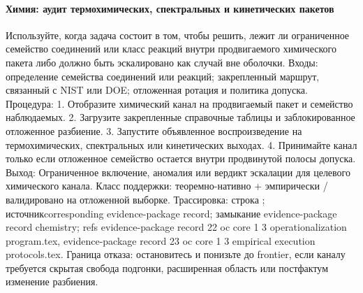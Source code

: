 \paragraph{Химия: аудит термохимических, спектральных и кинетических пакетов}
Используйте, когда задача состоит в том, чтобы решить, лежит ли ограниченное семейство соединений или класс реакций внутри продвигаемого химического пакета либо должно быть эскалировано как случай вне оболочки.
Входы: определение семейства соединений или реакций; \allowbreak закрепленный маршрут, связанный с NIST или DOE; \allowbreak отложенная ротация и политика допуска.
Процедура: 1. Отобразите химический канал на продвигаемый пакет и семейство наблюдаемых. 2. Загрузите закрепленные справочные таблицы и заблокированное отложенное разбиение. 3. Запустите объявленное воспроизведение на термохимических, спектральных или кинетических выходах. 4. Принимайте канал только если отложенное семейство остается внутри продвинутой полосы допуска.
Выход: Ограниченное включение, аномалия или вердикт эскалации для целевого химического канала.
Класс поддержки: теоремно-нативно + эмпирически / валидировано на отложенной выборке.
Трассировка: строка ; \allowbreak источникcorresponding evidence-package record; \allowbreak замыкание evidence-package record chemistry; \allowbreak refs evidence-package record 22 oc core 1 3 operationalization program.tex, \allowbreak evidence-package record 23 oc core 1 3 empirical execution protocols.tex.
Граница отказа: остановитесь и понизьте до frontier, если каналу требуется скрытая свобода подгонки, расширенная область или постфактум изменение разбиения.

